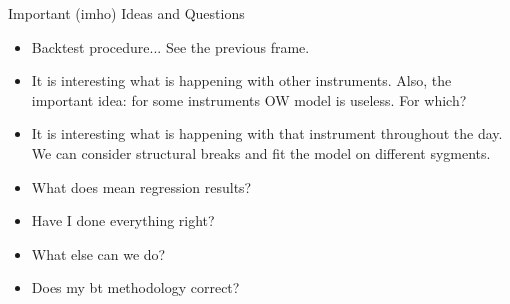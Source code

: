 \documentclass[aspectratio=169]{beamer}
\begin{document}
\begin{frame}{Important (imho) Ideas and Questions}
    \begin{itemize}
        \item Backtest procedure... See the previous frame.
        \item It is interesting what is happening with other instruments. Also, the important idea: for some instruments OW model is useless. For which?
        \item It is interesting what is happening with that instrument throughout the day. We can consider structural breaks and fit the model on different sygments.
        \item What does mean regression results?
        \item Have I done everything right?
        \item What else can we do?
        \item Does my bt methodology correct?
    \end{itemize}
\end{frame}
\end{document}

